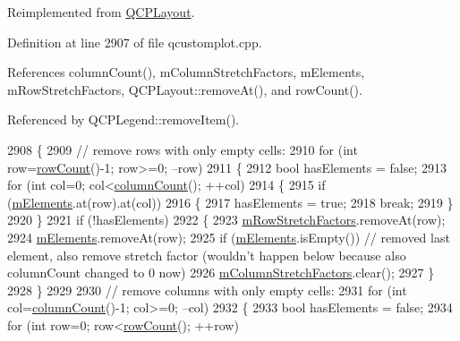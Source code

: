 Reimplemented from \hyperlink{class_q_c_p_layout_a41e6ac049143866e8f8b4964efab01b2}{Q\+C\+P\+Layout}.



Definition at line 2907 of file qcustomplot.\+cpp.



References column\+Count(), m\+Column\+Stretch\+Factors, m\+Elements, m\+Row\+Stretch\+Factors, Q\+C\+P\+Layout\+::remove\+At(), and row\+Count().



Referenced by Q\+C\+P\+Legend\+::remove\+Item().


\begin{DoxyCode}
2908 \{
2909   \textcolor{comment}{// remove rows with only empty cells:}
2910   \textcolor{keywordflow}{for} (\textcolor{keywordtype}{int} row=\hyperlink{class_q_c_p_layout_grid_af8e6c7a05864ebe610c87756c7b9079c}{rowCount}()-1; row>=0; --row)
2911   \{
2912     \textcolor{keywordtype}{bool} hasElements = \textcolor{keyword}{false};
2913     \textcolor{keywordflow}{for} (\textcolor{keywordtype}{int} col=0; col<\hyperlink{class_q_c_p_layout_grid_ac39074eafd148b82d0762090f258189e}{columnCount}(); ++col)
2914     \{
2915       \textcolor{keywordflow}{if} (\hyperlink{class_q_c_p_layout_grid_a3577d3855bf8ad20ef9079291a49f397}{mElements}.at(row).at(col))
2916       \{
2917         hasElements = \textcolor{keyword}{true};
2918         \textcolor{keywordflow}{break};
2919       \}
2920     \}
2921     \textcolor{keywordflow}{if} (!hasElements)
2922     \{
2923       \hyperlink{class_q_c_p_layout_grid_a36c85a7eaf342680fb9b8a4977486f16}{mRowStretchFactors}.removeAt(row);
2924       \hyperlink{class_q_c_p_layout_grid_a3577d3855bf8ad20ef9079291a49f397}{mElements}.removeAt(row);
2925       \textcolor{keywordflow}{if} (\hyperlink{class_q_c_p_layout_grid_a3577d3855bf8ad20ef9079291a49f397}{mElements}.isEmpty()) \textcolor{comment}{// removed last element, also remove stretch factor (wouldn't
       happen below because also columnCount changed to 0 now)}
2926         \hyperlink{class_q_c_p_layout_grid_ac6aabe62339f94f18b9f8adab94b1840}{mColumnStretchFactors}.clear();
2927     \}
2928   \}
2929   
2930   \textcolor{comment}{// remove columns with only empty cells:}
2931   \textcolor{keywordflow}{for} (\textcolor{keywordtype}{int} col=\hyperlink{class_q_c_p_layout_grid_ac39074eafd148b82d0762090f258189e}{columnCount}()-1; col>=0; --col)
2932   \{
2933     \textcolor{keywordtype}{bool} hasElements = \textcolor{keyword}{false};
2934     \textcolor{keywordflow}{for} (\textcolor{keywordtype}{int} row=0; row<\hyperlink{class_q_c_p_layout_grid_af8e6c7a05864ebe610c87756c7b9079c}{rowCount}(); ++row)

\end{DoxyCode}
